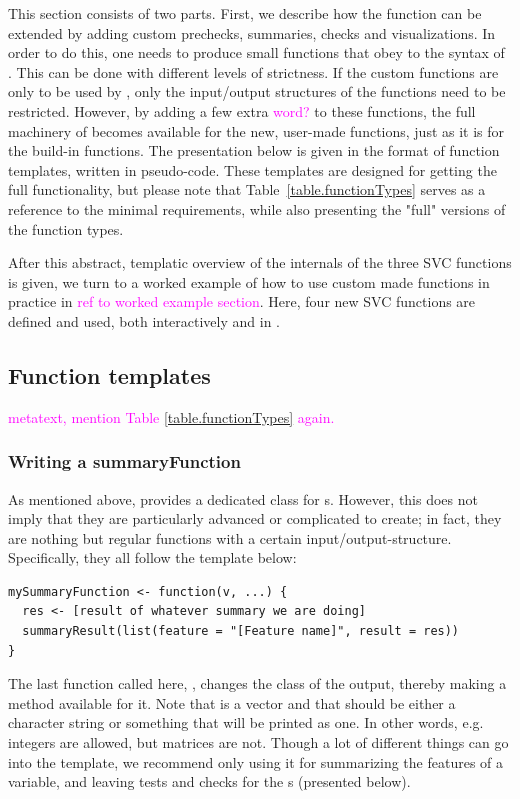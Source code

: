 \documentclass[article]{jss}
\newcommand{\hl}[1]{\textcolor{magenta}{#1}}
\newcommand{\R}[1]{\code{#1}}
\begin{document}
This section consists of two parts. First, we describe how the \R{clean} function can be extended by adding custom prechecks, summaries, checks and visualizations. In order to do this, one needs to produce small functions that obey to the syntax of . This can be done with different levels of strictness. If the custom functions are only to be used by \R{clean()}, only the input/output structures of the functions need to be restricted. However, by adding a few extra \hl{word?} to these functions, the full machinery of  becomes available for the new, user-made functions, just as it is for the build-in functions. The presentation below is given in the format of function templates, written in pseudo-code. These templates are designed for getting the full functionality, but please note that Table~\ref{table.functionTypes} serves as a reference to the minimal requirements, while also presenting the "full" versions of the function types.


After this abstract, templatic overview of the internals of the three SVC functions is given, we turn to a worked example of how to use custom made functions in practice in \hl{ref to worked example section}. Here, four new SVC functions are defined and used, both interactively and in \R{clean()}. 


\subsection{Function templates}
\label{sec:functionTemplates}
\hl{metatext, mention Table \ref{table.functionTypes} again.}

\subsubsection{Writing a summaryFunction}
As mentioned above,  provides a dedicated class for s. However, this does not imply that they are particularly advanced or complicated to create; in fact, they are nothing but regular functions with a certain input/output-structure. Specifically, they all follow the template below:
\begin{Verbatim}
mySummaryFunction <- function(v, ...) {
  res <- [result of whatever summary we are doing]
  summaryResult(list(feature = "[Feature name]", result = res))
}
\end{Verbatim}
The last function called here, \R{summaryResult()}, changes the class of the output, thereby making a \R{print()} method available for it.  Note that  is a vector and that  should be either a character string or something that will be printed as one. In other words, e.g. integers are allowed, but matrices are not. Though a lot of different things can go into the  template, we recommend only using it for summarizing the features of a variable, and leaving tests and checks for the s (presented below).
\end{document}
